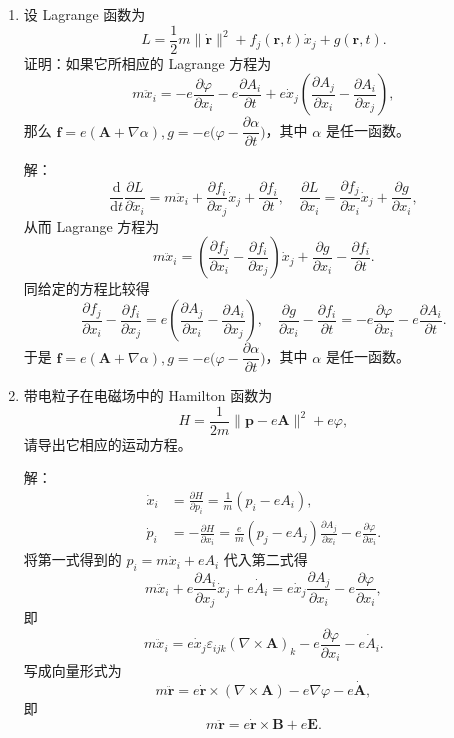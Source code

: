 \begin{enumerate}
\item 设 Lagrange 函数为
$$L=\frac{1}{2} m\|\dot{\boldsymbol{r}}\|^2+f_j(\boldsymbol{r}, t)\dot{x}_j+g(\boldsymbol{r}, t).$$
证明：如果它所相应的 Lagrange 方程为
$$m \ddot{x}_i=-e\frac{\partial \varphi}{\partial x_i}-e\frac{\partial A_i}{\partial t}+e \dot{x}_j\left(\frac{\partial A_j}{\partial x_i}-\frac{\partial A_i}{\partial x_j}\right),$$
那么 $\boldsymbol{f}=e(\boldsymbol{A}+\nabla \alpha), g=-e\Big(\varphi-\dfrac{\partial \alpha}{\partial t}\Big)$，其中 $\alpha$ 是任一函数。

解：$$\frac{\mathrm{d}}{\mathrm{d} t} \frac{\partial L}{\partial \dot{x}_{i}}
=m \ddot{x}_{i}+\frac{\partial f_{i}}{\partial x_{j}} \dot{x}_{j}+\frac{\partial f_{i}}{\partial t}, \quad 
\frac{\partial L}{\partial x_{i}}=\frac{\partial f_{j}}{\partial x_{i}} \dot{x}_{j}+\frac{\partial g}{\partial x_{i}},$$
从而 Lagrange 方程为
$$m \ddot{x}_{i}=\left(\frac{\partial f_{j}}{\partial x_{i}}-\frac{\partial f_{i}}{\partial x_{j}}\right) \dot{x}_{j}
+\frac{\partial g}{\partial x_{i}}-\frac{\partial f_{i}}{\partial t}.$$
同给定的方程比较得
$$\frac{\partial f_{j}}{\partial x_{i}}-\frac{\partial f_{i}}{\partial x_{j}}
=e\left(\frac{\partial A_{j}}{\partial x_{i}}-\frac{\partial A_{i}}{\partial x_{j}}\right), \quad \frac{\partial g}{\partial x_{i}}-\frac{\partial f_{i}}{\partial t}
=-e \frac{\partial \varphi}{\partial x_{i}}-e \frac{\partial A_{i}}{\partial t}.$$
于是 $\boldsymbol{f}=e(\boldsymbol{A}+\nabla \alpha), g=-e\Big(\varphi-\dfrac{\partial \alpha}{\partial t}\Big)$，其中 $\alpha$ 是任一函数。

\item 带电粒子在电磁场中的 Hamilton 函数为
$$H=\frac{1}{2m}\|\boldsymbol{p}-e\boldsymbol{A}\|^2+e\varphi,$$
请导出它相应的运动方程。

解：\begin{align*}
\dot{x}_{i} & =\frac{\partial H}{\partial p_{i}}=\frac{1}{m}(p_{i}-eA_{i}), \\
\dot{p}_{i} & =-\frac{\partial H}{\partial x_{i}}=\frac{e}{m}(p_{j}-eA_{j}) \frac{\partial A_{j}}{\partial x_{i}}-e\frac{\partial \varphi}{\partial x_{i}}.
\end{align*}
将第一式得到的 $p_{i}=m \dot{x}_{i}+e A_{i}$ 代入第二式得
$$m \ddot{x}_{i}+e \frac{\partial A_{i}}{\partial x_{j}} \dot{x}_{j}+e \dot{A}_{i}
=e \dot{x}_{j} \frac{\partial A_{j}}{\partial x_{i}}-e \frac{\partial \varphi}{\partial x_{i}},$$
即
$$m\ddot{x}_{i}=e\dot{x}_{j}\varepsilon_{ijk}(\nabla \times \boldsymbol{A})_{k}-e\frac{\partial \varphi}{\partial x_{i}}-e\dot{A}_{i}.$$
写成向量形式为
$$m\ddot{\boldsymbol{r}}=e\dot{\boldsymbol{r}} \times(\nabla \times \boldsymbol{A})-e\nabla\varphi-e\dot{\boldsymbol{A}},$$
即
$$m\ddot{\boldsymbol{r}}=e\dot{\boldsymbol{r}} \times \boldsymbol{B}+e\boldsymbol{E}.$$
\end{enumerate}


